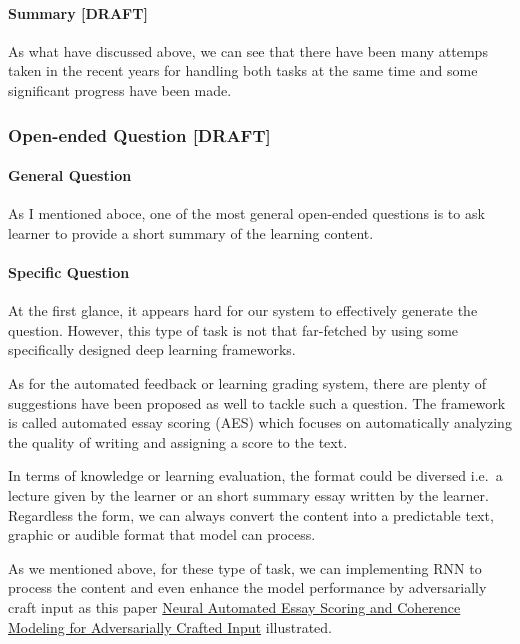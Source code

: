 \documentclass[]{book}
\let\oldparagraph\paragraph
\renewcommand{\paragraph}[1]{\oldparagraph{#1}\mbox{}}
\theoremstyle{definition}
\theoremstyle{definition}
\theoremstyle{definition}
\theoremstyle{remark}
\begin{document}
\paragraph{Summary {[}DRAFT{]}}\label{summary-draft}

As what have discussed above, we can see that there have been many
attemps taken in the recent years for handling both tasks at the same
time and some significant progress have been made.

\subsubsection{Open-ended Question
{[}DRAFT{]}}\label{open-ended-question-draft}

\paragraph{General Question}\label{general-question}

As I mentioned aboce, one of the most general open-ended questions is to
ask learner to provide a short summary of the learning content.

\paragraph{Specific Question}\label{specific-question}

At the first glance, it appears hard for our system to effectively
generate the question. However, this type of task is not that
far-fetched by using some specifically designed deep learning
frameworks.

As for the automated feedback or learning grading system, there are
plenty of suggestions have been proposed as well to tackle such a
question. The framework is called automated essay scoring (AES) which
focuses on automatically analyzing the quality of writing and assigning
a score to the text.

In terms of knowledge or learning evaluation, the format could be
diversed i.e.~a lecture given by the learner or an short summary essay
written by the learner. Regardless the form, we can always convert the
content into a predictable text, graphic or audible format that model
can process.

As we mentioned above, for these type of task, we can implementing RNN
to process the content and even enhance the model performance by
adversarially craft input as this paper
\href{http://aclweb.org/anthology/N18-1024}{Neural Automated Essay
Scoring and Coherence Modeling for Adversarially Crafted Input}
illustrated.
\end{document}
